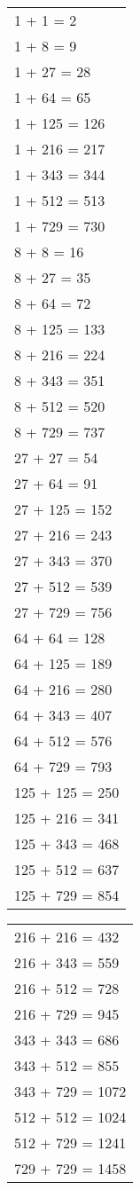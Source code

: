 \documentclass[12pt]{article}
\begin{document}
\begin{multicols}{2}
\noindent
\begin{tabular}{l}
       1 + 1 = 2 \\
       1 + 8 = 9 \\
     1 + 27 = 28 \\
     1 + 64 = 65 \\
   1 + 125 = 126 \\
   1 + 216 = 217 \\
   1 + 343 = 344 \\
   1 + 512 = 513 \\
   1 + 729 = 730 \\
      8 + 8 = 16 \\
     8 + 27 = 35 \\
     8 + 64 = 72 \\
   8 + 125 = 133 \\
   8 + 216 = 224 \\
   8 + 343 = 351 \\
   8 + 512 = 520 \\
   8 + 729 = 737 \\
    27 + 27 = 54 \\
    27 + 64 = 91 \\
  27 + 125 = 152 \\
  27 + 216 = 243 \\
  27 + 343 = 370 \\
  27 + 512 = 539 \\
  27 + 729 = 756 \\
   64 + 64 = 128 \\
  64 + 125 = 189 \\
  64 + 216 = 280 \\
  64 + 343 = 407 \\
  64 + 512 = 576 \\
  64 + 729 = 793 \\
 125 + 125 = 250 \\
 125 + 216 = 341 \\
 125 + 343 = 468 \\
 125 + 512 = 637 \\
 125 + 729 = 854 \\
\end{tabular}

\columnbreak

\begin{tabular}{l}
 216 + 216 = 432 \\
 216 + 343 = 559 \\
 216 + 512 = 728 \\
 216 + 729 = 945 \\
 343 + 343 = 686 \\
 343 + 512 = 855 \\
343 + 729 = 1072 \\
512 + 512 = 1024 \\
512 + 729 = 1241 \\
729 + 729 = 1458 \\
\end{tabular}
\end{multicols}
\end{document}
